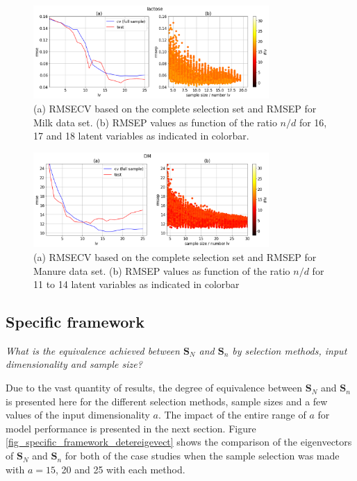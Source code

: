 \documentclass[journal=ancham,manuscript=article]{achemso}
\begin{document}
\begin{figure}[b]
\includegraphics[width=0.8\textwidth]{manuscript/figures/d01_milk_general_framework.png}
\centering
\caption{(a) RMSECV based on the complete selection set and RMSEP for Milk data set. (b) RMSEP values as function of the ratio $n/d$ for 16, 17 and 18 latent variables as indicated in colorbar.}
\label{fig_d01_milk_general_framework}
\end{figure}

\begin{figure}[b]
\includegraphics[width=0.8\textwidth]{manuscript/figures/d02_manure_general_framework.png}
\centering
\caption{(a) RMSECV based on the complete selection set and RMSEP for Manure data set. (b) RMSEP values as function of the ratio $n/d$ for 11 to 14 latent variables as indicated in colorbar}
\label{fig_d02_manure_general_framework}
\end{figure}

\subsection*{Specific framework}\label{results:specframework}

\emph{What is the equivalence achieved between $\mathbf{S}_N$ and $\mathbf{S}_n$ by selection methods, input dimensionality and sample size?} 

Due to the vast quantity of results, the degree of equivalence between $\mathbf{S}_N$ and $\mathbf{S}_n$ is presented here for the different selection methods, sample sizes and a few values of the input dimensionality $a$. The impact of the entire range of $a$ for model performance is presented in the next section. Figure \ref{fig_specific_framework_detereigevect} shows the comparison of the eigenvectors of $\mathbf{S}_N$ and $\mathbf{S}_n$ for both of the case studies when the sample selection was made with $a=15$, 20 and 25 with each method. 
\end{document}
